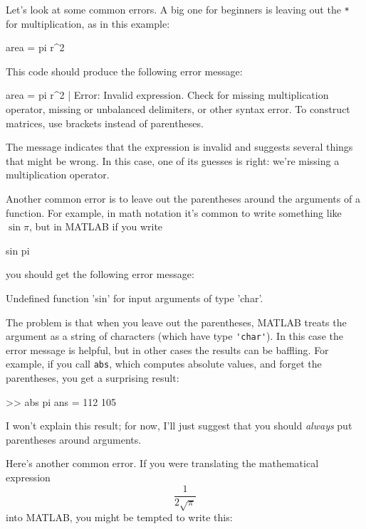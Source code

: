 Let's look at some common errors. A big one for beginners is leaving out the \lstinline{*}
for multiplication, as in this example:

\begin{code}
area = pi r^2
\end{code}

This code should produce the following error message:

\begin{stdout}
 area = pi r^2
           |
Error: Invalid expression. Check for missing multiplication
operator, missing or unbalanced delimiters, or other syntax
error. To construct matrices, use brackets instead of parentheses.
\end{stdout}
%
%

The message indicates that the expression is invalid and suggests several things that might be wrong.
In this case, one of its guesses is right: we're missing a multiplication operator.


Another common error is to leave out the parentheses around the
arguments of a function.  For example, in math notation it's common
to write something like $\sin \pi$, but in MATLAB if you write

\begin{code}
sin pi
\end{code}
you should get the following error message:

\begin{stdout}
Undefined function 'sin' for input arguments of type 'char'.
\end{stdout}

The problem is that when you leave out the parentheses, MATLAB treats
the argument as a string of characters (which have type \lstinline{'char'}).
In this case the error message is helpful, but in other cases the results can be baffling.
For example, if you call \lstinline{abs}, which computes absolute values, and forget the parentheses, you get a surprising result:

\begin{code}
>> abs pi
ans =  112   105
\end{code}

I won't explain this result; for now, I'll just suggest that you should \mbox{\emph{always}} put parentheses around arguments.


Here's another common error.
If you were translating the mathematical expression
%
\[ \frac{1}{2 \sqrt \pi} \]
%
into MATLAB, you might be tempted to write this:

